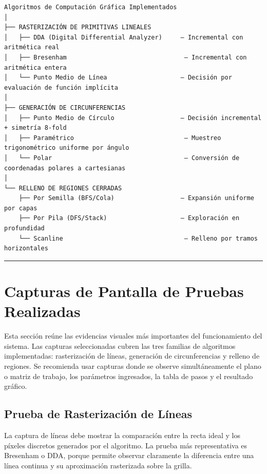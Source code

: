 \documentclass[
  spanish,
  a4paper,
  12pt,
]{article}
\begin{document}
\begin{lstlisting}
Algoritmos de Computación Gráfica Implementados
│
├── RASTERIZACIÓN DE PRIMITIVAS LINEALES
│   ├── DDA (Digital Differential Analyzer)     — Incremental con aritmética real
│   ├── Bresenham                                — Incremental con aritmética entera
│   └── Punto Medio de Línea                    — Decisión por evaluación de función implícita
│
├── GENERACIÓN DE CIRCUNFERENCIAS
│   ├── Punto Medio de Círculo                  — Decisión incremental + simetría 8-fold
│   ├── Paramétrico                              — Muestreo trigonométrico uniforme por ángulo
│   └── Polar                                    — Conversión de coordenadas polares a cartesianas
│
└── RELLENO DE REGIONES CERRADAS
    ├── Por Semilla (BFS/Cola)                  — Expansión uniforme por capas
    ├── Por Pila (DFS/Stack)                    — Exploración en profundidad
    └── Scanline                                 — Relleno por tramos horizontales
\end{lstlisting}

\begin{center}\rule{0.5\linewidth}{0.5pt}\end{center}

\section{Capturas de Pantalla de Pruebas Realizadas}\label{capturas-de-pantalla-de-pruebas-realizadas}

Esta sección reúne las evidencias visuales más importantes del
funcionamiento del sistema. Las capturas seleccionadas cubren las tres
familias de algoritmos implementadas: rasterización de líneas,
generación de circunferencias y relleno de regiones. Se recomienda usar
capturas donde se observe simultáneamente el plano o matriz de trabajo,
los parámetros ingresados, la tabla de pasos y el resultado gráfico.

\subsection{Prueba de Rasterización de Líneas}\label{prueba-de-rasterizacion-de-lineas}

La captura de líneas debe mostrar la comparación entre la recta ideal y
los píxeles discretos generados por el algoritmo. La prueba más
representativa es Bresenham o DDA, porque permite observar claramente la
diferencia entre una línea continua y su aproximación rasterizada sobre
la grilla.
\end{document}
